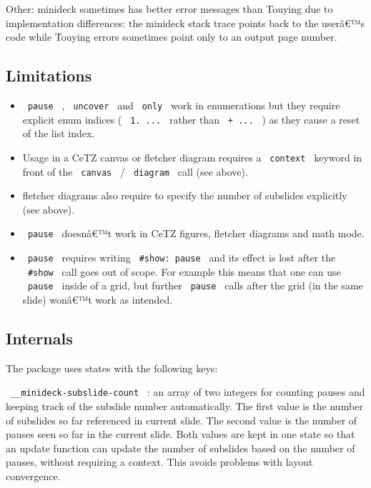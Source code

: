 Other: minideck sometimes has better error messages than Touying due to
implementation differences: the minideck stack trace points back to the
userâ€™s code while Touying errors sometimes point only to an output
page number.

\subsection{Limitations}\label{limitations}

\begin{itemize}
\tightlist
\item
  \texttt{\ pause\ } , \texttt{\ uncover\ } and \texttt{\ only\ } work
  in enumerations but they require explicit enum indices (
  \texttt{\ 1.\ ...\ } rather than \texttt{\ +\ ...\ } ) as they cause a
  reset of the list index.
\item
  Usage in a CeTZ canvas or fletcher diagram requires a
  \texttt{\ context\ } keyword in front of the \texttt{\ canvas\ } /
  \texttt{\ diagram\ } call (see above).
\item
  fletcher diagrams also require to specify the number of subslides
  explicitly (see above).
\item
  \texttt{\ pause\ } doesnâ€™t work in CeTZ figures, fletcher diagrams
  and math mode.
\item
  \texttt{\ pause\ } requires writing \texttt{\ \#show:\ pause\ } and
  its effect is lost after the \texttt{\ \#show\ } call goes out of
  scope. For example this means that one can use \texttt{\ pause\ }
  inside of a grid, but further \texttt{\ pause\ } calls after the grid
  (in the same slide) wonâ€™t work as intended.
\end{itemize}

\subsection{Internals}\label{internals}

The package uses states with the following keys:

\texttt{\ \_\_minideck-subslide-count\ } : an array of two integers for
counting pauses and keeping track of the subslide number automatically.
The first value is the number of subslides so far referenced in current
slide. The second value is the number of pauses seen so far in the
current slide. Both values are kept in one state so that an update
function can update the number of subslides based on the number of
pauses, without requiring a context. This avoids problems with layout
convergence.

